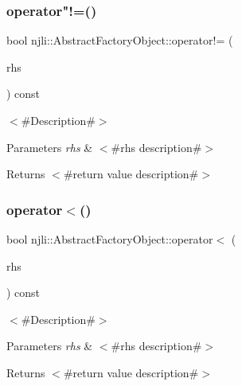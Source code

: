 \mbox{\label{classnjli_1_1_abstract_factory_object_a475bffe85257bce9d5ad5ea4a991fdf9}} 
\subsubsection{\texorpdfstring{operator"!=()}{operator!=()}}
{\footnotesize\ttfamily bool njli\+::\+Abstract\+Factory\+Object\+::operator!= (\begin{DoxyParamCaption}\item[{const \mbox{\hyperlink{classnjli_1_1_abstract_factory_object}{Abstract\+Factory\+Object}} \&}]{rhs }\end{DoxyParamCaption}) const}

$<$\#\+Description\#$>$


\begin{DoxyParams}{Parameters}
{\em rhs} & $<$\#rhs description\#$>$\\
\hline
\end{DoxyParams}
\begin{DoxyReturn}{Returns}
$<$\#return value description\#$>$ 
\end{DoxyReturn}
\mbox{\label{classnjli_1_1_abstract_factory_object_af62456deb9b3cd80eeb894b7ee033f44}} 
\subsubsection{\texorpdfstring{operator$<$()}{operator<()}}
{\footnotesize\ttfamily bool njli\+::\+Abstract\+Factory\+Object\+::operator$<$ (\begin{DoxyParamCaption}\item[{const \mbox{\hyperlink{classnjli_1_1_abstract_factory_object}{Abstract\+Factory\+Object}} \&}]{rhs }\end{DoxyParamCaption}) const}

$<$\#\+Description\#$>$


\begin{DoxyParams}{Parameters}
{\em rhs} & $<$\#rhs description\#$>$\\
\hline
\end{DoxyParams}
\begin{DoxyReturn}{Returns}
$<$\#return value description\#$>$ 
\end{DoxyReturn}
\mbox{\label{classnjli_1_1_abstract_factory_object_a2703a2ef27de3bd21b0905c571235922}} 
